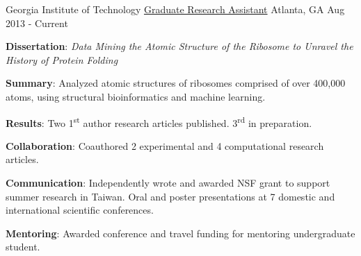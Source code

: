 

\begin{cventries}

  \cventry
    {Georgia Institute of Technology} %
    {\href{https://scholar.google.com/citations?hl=en&user=KIFFrX4AAAAJ&view_op=list_works&gmla=AJsN-F6ZS9ZeLqMG4o6JCZS87HLjoP76wA4kFValw4xx0A6ZWJJoxCWe2xu6VZvt_LgEw9YpCglVTlKY_5PfKpxiyghYFxLPNm5zrUwdBE5Fn-Sr098nt7NJGM2cH5l47IrTsSra8Vob}{Graduate Research Assistant}} %
    {Atlanta, GA} %
    {Aug 2013 - Current} %
    {{\textbf{Dissertation}: \textit{Data Mining the Atomic Structure of the Ribosome to Unravel the History of Protein Folding}}
      \begin{cvitems} %
      \vspace{4.0mm}
        \item \textbf{Summary}: Analyzed atomic structures of ribosomes comprised of over 400,000 atoms, using structural bioinformatics and machine learning. 
        \item \textbf{Results}: Two 1\textsuperscript{st} author research articles published. 3\textsuperscript{rd} in preparation.
        \item \textbf{Collaboration}: Coauthored 2 experimental and 4 computational research articles.
        \item \textbf{Communication}: Independently wrote and awarded NSF grant to support summer research in Taiwan. Oral and poster presentations at 7 domestic and international scientific conferences.
        \item \textbf{Mentoring}: Awarded conference and travel funding for mentoring undergraduate student.
      \end{cvitems}
    }


\end{cventries}
